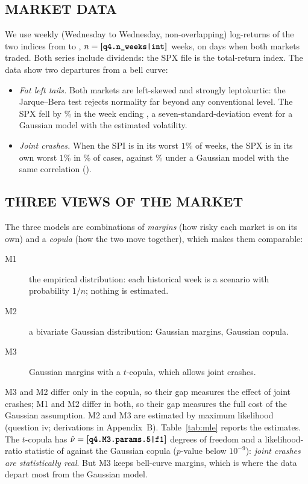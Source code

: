 \subsection{MARKET DATA}
We use weekly (Wednesday to Wednesday, non-overlapping) log-returns of the two indices from  to , $n=\val{q4.n_weeks|int}$ weeks, on days when both markets traded. Both series include dividends: the SPX file is the total-return index. The data show two departures from a bell curve:
\begin{itemize}
\item \emph{Fat left tails.} Both markets are left-skewed and strongly leptokurtic: the Jarque--Bera test rejects normality far beyond any conventional level. The SPX fell by \% in the week ending , a seven-standard-deviation event for a Gaussian model with the estimated volatility.
\item \emph{Joint crashes.} When the SPI is in its worst $1\%$ of weeks, the SPX is in its own worst $1\%$ in \% of cases, against \% under a Gaussian model with the same correlation ().
\end{itemize}

\subsection{THREE VIEWS OF THE MARKET}
The three models are combinations of \emph{margins} (how risky each market is on its own) and a \emph{copula} (how the two move together), which makes them comparable:
\begin{description}
\item[M1] the empirical distribution: each historical week is a scenario with probability $1/n$; nothing is estimated.
\item[M2] a bivariate Gaussian distribution: Gaussian margins, Gaussian copula.
\item[M3] Gaussian margins with a $t$-copula, which allows joint crashes.
\end{description}
M3 and M2 differ only in the copula, so their gap measures the effect of joint crashes; M1 and M2 differ in both, so their gap measures the full cost of the Gaussian assumption. M2 and M3 are estimated by maximum likelihood (question iv; derivations in Appendix~B). Table~\ref{tab:mle} reports the estimates. The $t$-copula has $\hat\nu=\val{q4.M3.params.5|f1}$ degrees of freedom and a likelihood-ratio statistic of  against the Gaussian copula ($p$-value below $10^{-9}$): \emph{joint crashes are statistically real}. But M3 keeps bell-curve margins, which is where the data depart most from the Gaussian model.

\begin{table}[tb]
\caption{Maximum-likelihood estimates of M2 and M3, weekly log-returns (standard errors in parentheses).}
\label{tab:mle}
\centering
{}
\end{table}

